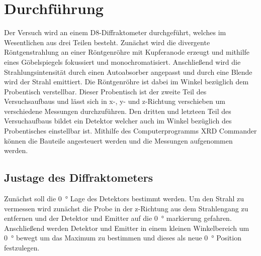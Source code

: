 \newpage
\section{Durchführung}
\label{sec:Durchfuehrung}
    Der Versuch wird an einem D8-Diffraktometer durchgeführt, welches im Wesentlichen aus drei Teilen besteht.
    Zunächst wird die divergente Röntgenstrahlung an einer Röntgenröhre mit Kupferanode erzeugt und mithilfe eines Göbelspiegels fokussiert und monochromatisiert.
    Anschließend wird die Strahlungsintensität durch einen Autoabsorber angepasst und durch eine Blende wird der Strahl emittiert.
    Die Röntgenröhre ist dabei im Winkel bezüglich dem Probentisch verstellbar.
    Dieser Probentisch ist der zweite Teil des Versuchsaufbaus und lässt sich in x-, y- und z-Richtung verschieben um verschiedene Messungen durchzuführen.
    Den dritten und letzteen Teil des Versuchaufbaus bildet ein Detektor welcher auch im Winkel bezüglich des Probentisches einstellbar ist.
    Mithilfe des Computerprogramms XRD Commander können die Bauteile angesteuert werden und die Messungen aufgenommen werden.

    \subsection{Justage des Diffraktometers}
        Zunächst soll die \SI{0}{\degree} Lage des Detektors bestimmt werden.
        Um den Strahl zu vermessen wird zunächst die Probe in der z-Richtung aus dem Strahlengang zu entfernen und der Detektor und Emitter auf die \SI{0}{\degree} markierung gefahren.
        Anschließend werden Detektor und Emitter in einem kleinen Winkelbereich um \SI{0}{\degree} bewegt um das Maximum zu bestimmen und dieses als neue \SI{0}{\degree} Position festzulegen.